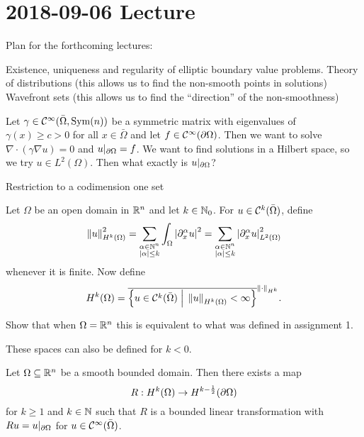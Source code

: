 \section{2018-09-06 Lecture}

Plan for the forthcoming lectures:

\begin{itm}
  \io Existence, uniqueness and regularity of elliptic boundary value problems.
  \io Theory of distributions (this allows us to find the non-smooth points in solutions)
  \io Wavefront sets (this allows us to find the ``direction'' of the non-smoothness)
\end{itm}

Let $\gamma\in\mathcal{C}^\infty(\bar\Omega,\operatorname{Sym}(n))$ be a symmetric matrix with eigenvalues of $\gamma(x)\geq c>0$ for all $x\in\bar\Omega$ and let $f\in\mathcal{C}^\infty(\partial\Omega)$.
Then we want to solve $\nabla\cdot(\gamma\nabla u)=0$ and $u|_{\partial\Omega}=f$.
We want to find solutions in a Hilbert space, so we try $u\in L^2(\Omega)$.
Then what exactly is $u|_{\partial\Omega}$?

Restriction to a codimension one set

\begin{defn}
  Let $\Omega$ be an open domain in $\mathbb{R}^n$ and let $k\in\mathbb{N}_0$.
  For $u\in\mathcal{C}^k(\bar\Omega)$, define
  \[ \left\lVert u \right\rVert_{H^k(\Omega)}^2 = \sum_{\substack{\alpha\in\mathbb{N}^n\\\left\lvert \alpha \right\rvert\leq k}} \int_\Omega \left\lvert \partial_x^\alpha u \right\rvert^2 = \sum_{\substack{\alpha\in\mathbb{N}^n\\\left\lvert \alpha \right\rvert\leq k}} \left\lvert \partial_x^\alpha u \right\rvert_{L^2(\Omega)}^2 \]
  whenever it is finite.
  Now define
  \[ H^k(\Omega) = \overline{ \left\{ u\in\mathcal{C}^k(\bar\Omega) \; \Big\vert \; \left\lVert u \right\rVert_{H^k(\Omega)}<\infty \right\}}^{\left\lVert \cdot \right\rVert_{H^k}}. \]
\end{defn}

\begin{exer}
  Show that when $\Omega=\mathbb{R}^n$ this is equivalent to what was defined in assignment 1.
\end{exer}

\begin{rmk}
  These spaces can also be defined for $k<0$.
\end{rmk}

\begin{thm}\label{11:boundary}
  Let $\Omega\subseteq\mathbb{R}^n$ be a smooth bounded domain.
  Then there exists a map
  \[ R: H^k(\Omega) \to H^{k-\frac12}(\partial\Omega) \]
  for $k\geq 1$ and $k\in\mathbb{N}$ such that $R$ is a bounded linear transformation with $Ru=u|_{\partial\Omega}$ for $u\in\mathcal{C}^\infty(\bar\Omega)$.
\end{thm}

